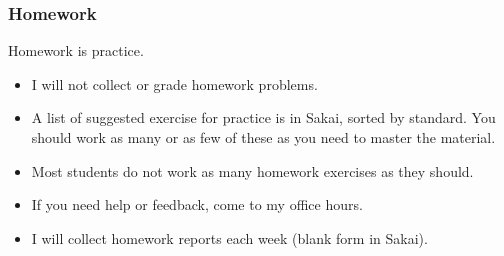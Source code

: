 \begin{frame}\frametitle{Homework}
Homework is practice.
\begin{itemize}
\item I will not collect or grade homework problems.
\item A list of suggested exercise for practice is in Sakai, sorted by standard.  You should work as many or as few of these as you need to master the material.
\item {} Most students do not work as many homework exercises as they should.
\item If you need help or feedback, come to my office hours.
\item I will collect homework reports each week (blank form in Sakai).
\end{itemize}
\end{frame}

